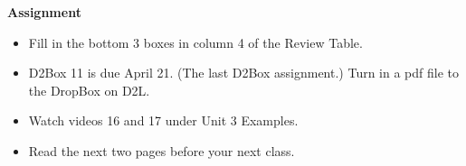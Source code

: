 \begin{center}
  {\large\bf Assignment}
\end{center}

\begin{itemize}
\item Fill in the bottom 3 boxes in column 4 of the Review Table. 
\item D2Box 11 is due April 21. (The last D2Box assignment.)  Turn in
  a pdf file to the DropBox on D2L.
\item Watch   videos 16 and 17 under Unit 3 Examples.
\item Read the next two pages before your next class.
\end{itemize}
